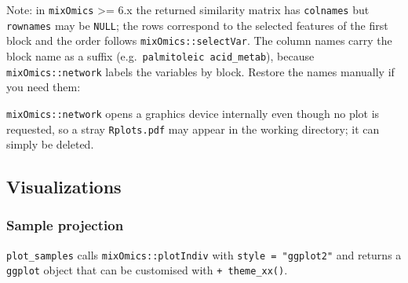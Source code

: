 \documentclass[
]{book}
\newenvironment{Shaded}{\begin{snugshade}}{\end{snugshade}}
\newcommand{\AttributeTok}[1]{\textcolor[rgb]{0.13,0.29,0.53}{#1}}
\newcommand{\CommentTok}[1]{\textcolor[rgb]{0.56,0.35,0.01}{\textit{#1}}}
\newcommand{\ControlFlowTok}[1]{\textcolor[rgb]{0.13,0.29,0.53}{\textbf{#1}}}
\newcommand{\DecValTok}[1]{\textcolor[rgb]{0.00,0.00,0.81}{#1}}
\newcommand{\FunctionTok}[1]{\textcolor[rgb]{0.13,0.29,0.53}{\textbf{#1}}}
\newcommand{\NormalTok}[1]{#1}
\newcommand{\OtherTok}[1]{\textcolor[rgb]{0.56,0.35,0.01}{#1}}
\newcommand{\SpecialCharTok}[1]{\textcolor[rgb]{0.81,0.36,0.00}{\textbf{#1}}}
\newcommand{\StringTok}[1]{\textcolor[rgb]{0.31,0.60,0.02}{#1}}
\begin{document}
Note: in \texttt{mixOmics} \textgreater= 6.x the returned similarity matrix has \texttt{colnames} but \texttt{rownames} may be \texttt{NULL}; the rows correspond to the selected features of the first block and the order follows \texttt{mixOmics::selectVar}.
The column names carry the block name as a suffix (e.g.~\texttt{palmitoleic\ acid\_metab}), because \texttt{mixOmics::network} labels the variables by block.
Restore the names manually if you need them:

\begin{Shaded}
\end{Shaded}

\texttt{mixOmics::network} opens a graphics device internally even though no plot is requested, so a stray \texttt{Rplots.pdf} may appear in the working directory; it can simply be deleted.

\subsection{Visualizations}\label{visualizations}

\subsubsection{Sample projection}\label{sample-projection}

\texttt{plot\_samples} calls \texttt{mixOmics::plotIndiv} with \texttt{style\ =\ "ggplot2"} and returns a \texttt{ggplot} object that can be customised with \texttt{+\ theme\_xx()}.
\end{document}
